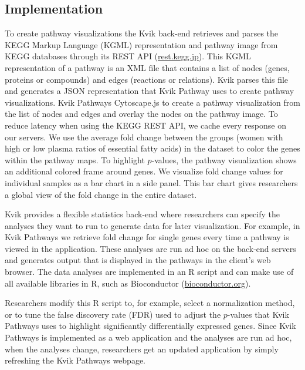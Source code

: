 \subsection{Implementation} 
To create pathway visualizations the Kvik back-end retrieves and parses the KEGG
Markup Language (KGML) representation and pathway image from KEGG databases
through its REST API (\href{rest.kegg.jp}{rest.kegg.jp}).  This KGML
representation of a pathway is an XML file that contains a list of nodes (genes,
proteins or compounds) and edges (reactions or relations). Kvik parses this file
and generates a JSON representation that Kvik Pathway uses to create pathway
visualizations.  Kvik Pathways Cytoscape.js to create a pathway visualization
from the list of nodes and edges and overlay the nodes on the pathway image. To
reduce latency when using
the KEGG REST API, we cache every response on our servers. 
We use the average fold change between the groups (women with high or low plasma
ratios of essential fatty acids) in the dataset to color the genes within the
pathway maps.  To highlight $p$-values, the pathway visualization shows an
additional colored frame around genes. We visualize fold change values for
individual samples as a bar chart in a side panel.  This bar chart gives
researchers a global view of the fold change in the entire dataset. 

Kvik provides a flexible statistics back-end where researchers can specify the
analyses they want to run to generate data for later visualization. For example,
in Kvik Pathways we retrieve fold change for single genes every time a pathway
is viewed in the application.  These analyses are run ad hoc on the back-end
servers and generates output that is displayed in the pathways in the client's
web browser. The data analyses are implemented in an R script and can make use
of all available libraries in R, such as Bioconductor
(\href{bioconductor.org}{bioconductor.org}). 

Researchers modify this R script to, for example, select a normalization method,
or to tune the false discovery rate (FDR) used to adjust the $p$-values that
Kvik Pathways uses to highlight significantly differentially expressed genes.
Since Kvik Pathways is implemented as a web application and the analyses are run
ad hoc, when the analyses change, researchers get an updated application by
simply refreshing the Kvik Pathways webpage.

